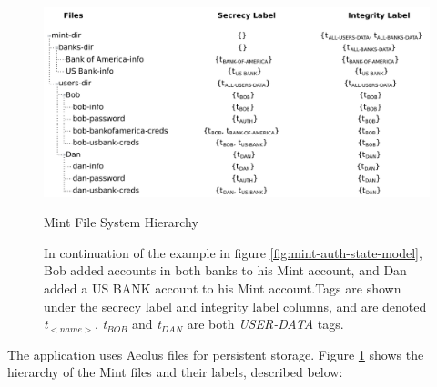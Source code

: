 \begin{figure}[h]
\centering
\includegraphics[width=\textwidth,height=\textheight,keepaspectratio]{figures/mint-filesystem}
\caption*{Mint File System Hierarchy}
\caption{In continuation of the example in figure \ref{fig:mint-auth-state-model}, Bob added accounts in both banks to his Mint account, and Dan added a US BANK account to his Mint account.Tags are shown under the secrecy label and integrity label columns, and are denoted \emph{t$_{<name>}$}. \emph{t$_{BOB}$} and \emph{t$_{DAN}$} are both \emph{USER-DATA} tags.}
\label{fig:mint-fs}
\end{figure}

The application uses Aeolus files for persistent storage. Figure \ref{fig:mint-fs} shows the hierarchy of the Mint files and their labels, described below:

